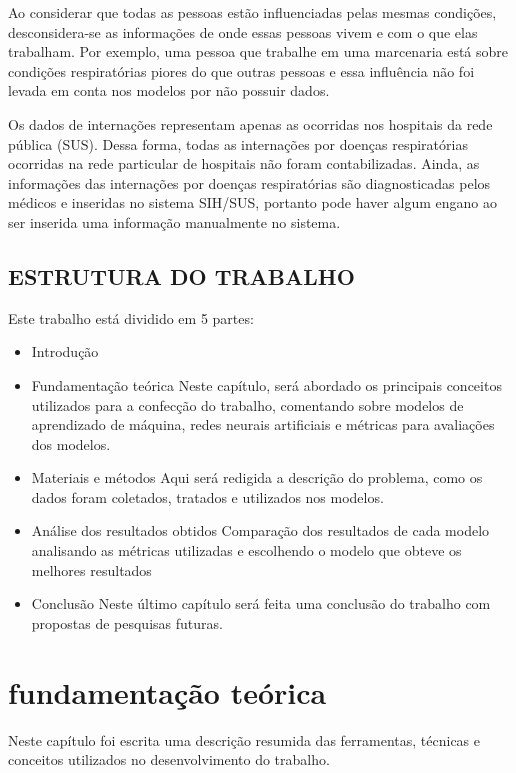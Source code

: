 \documentclass[
  12pt,		%
  a4paper,	%
  openright,%
  oneside,	%
  chapter=TITLE,		%
  section=TITLE,		%
  english,	%
  french,	%
  spanish,	%
  brazil	%
]{abntex2}
\begin{document}
    Ao considerar que todas as pessoas estão influenciadas pelas mesmas condições, desconsidera-se 
    as informações de onde essas pessoas vivem e com o que elas trabalham. Por exemplo, uma pessoa que trabalhe em uma marcenaria
    está sobre condições respiratórias piores do que outras pessoas e essa influência não foi levada em conta nos modelos por não possuir dados.

    Os dados de internações representam apenas as ocorridas nos hospitais da rede pública (SUS). Dessa forma, todas as internações
    por doenças respiratórias ocorridas na rede particular de hospitais não foram contabilizadas. Ainda, as informações das internações por doenças 
    respiratórias são diagnosticadas pelos médicos e inseridas no sistema SIH/SUS, portanto pode haver algum engano ao ser inserida uma informação
    manualmente no sistema.

    \section{ESTRUTURA DO TRABALHO}

    Este trabalho está dividido em 5 partes: 
    
    \begin{itemize}
        \item Introdução
        \item Fundamentação teórica
            \subitem Neste capítulo, será abordado os principais conceitos utilizados para a confecção do trabalho, 
            comentando sobre modelos de aprendizado de máquina, redes neurais artificiais e métricas
            para avaliações dos modelos.
        \item Materiais e métodos
            \subitem Aqui será redigida a descrição do problema, como os dados foram coletados, tratados
            e utilizados nos modelos.
        \item Análise dos resultados obtidos
            \subitem Comparação dos resultados de cada modelo analisando as métricas utilizadas e escolhendo o modelo que obteve os melhores resultados
        \item Conclusão
            \subitem Neste último capítulo será feita uma conclusão do trabalho com propostas de pesquisas futuras.
    \end{itemize}

    \chapter{fundamentação teórica}
    Neste capítulo foi escrita uma descrição resumida das ferramentas, técnicas e conceitos utilizados
    no desenvolvimento do trabalho.
\end{document}
